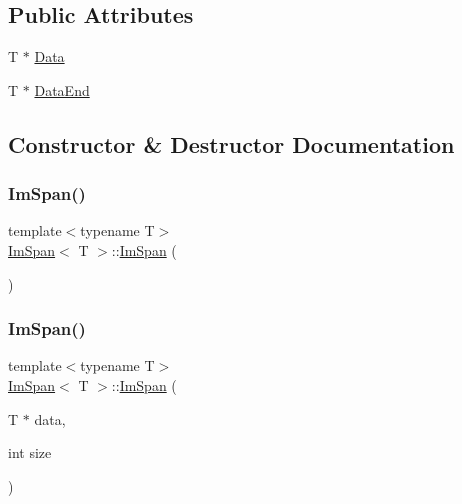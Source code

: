 \subsection*{Public Attributes}
\begin{DoxyCompactItemize}
\item 
T $\ast$ \hyperlink{structImSpan_a9cb5f8d45dff07a275c97b4d07915878}{Data}
\item 
T $\ast$ \hyperlink{structImSpan_a15a821b2ed71c9e447611cb3fe21d16c}{Data\+End}
\end{DoxyCompactItemize}


\subsection{Constructor \& Destructor Documentation}
\mbox{\label{structImSpan_a7321bafbe082a57c06851713da41c42d}} 
\subsubsection{\texorpdfstring{Im\+Span()}{ImSpan()}\hspace{0.1cm}{\footnotesize\ttfamily [1/3]}}
{\footnotesize\ttfamily template$<$typename T$>$ \\
\hyperlink{structImSpan}{Im\+Span}$<$ T $>$\+::\hyperlink{structImSpan}{Im\+Span} (\begin{DoxyParamCaption}{ }\end{DoxyParamCaption})\hspace{0.3cm}{\ttfamily [inline]}}

\mbox{\label{structImSpan_a504d7469748d2ebf782f3993d8f35ad2}} 
\subsubsection{\texorpdfstring{Im\+Span()}{ImSpan()}\hspace{0.1cm}{\footnotesize\ttfamily [2/3]}}
{\footnotesize\ttfamily template$<$typename T$>$ \\
\hyperlink{structImSpan}{Im\+Span}$<$ T $>$\+::\hyperlink{structImSpan}{Im\+Span} (\begin{DoxyParamCaption}\item[{T $\ast$}]{data,  }\item[{int}]{size }\end{DoxyParamCaption})\hspace{0.3cm}{\ttfamily [inline]}}

